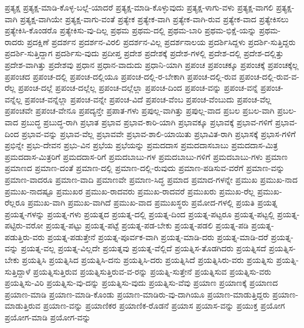 {ಪ್ರತ್ಯಕ್ಷ
ಪ್ರತ್ಯಕ್ಷ-ಮಾಡಿ-ಕೊಳ್ಳ-ಬಲ್ಲೆ-ಯಾದರೆ
ಪ್ರತ್ಯಕ್ಷ-ಮಾಡಿ-ಕೊಳ್ಳುವುದು
ಪ್ರತ್ಯಕ್ಷ-ಳಾಗು-ವಳು
ಪ್ರತ್ಯಕ್ಷ-ವಾಗಲಿ
ಪ್ರತ್ಯಕ್ಷ-ವಾಗಿ
ಪ್ರತ್ಯಕ್ಷ-ವಾಗಿಯೇ
ಪ್ರತ್ಯಕ್ಷ-ವಾಗು-ವಂತೆ
ಪ್ರತ್ಯೇಕ
ಪ್ರತ್ಯೇಕ-ವಾಗಿ
ಪ್ರತ್ಯೇಕ-ವಾಗಿ-ರುವ
ಪ್ರತ್ಯೇಕ-ವಾದ
ಪ್ರತ್ಯೇಕಿಸಲು
ಪ್ರತ್ಯೇಕಿಸಿ-ಕೊಂಡರೊ
ಪ್ರತ್ಯೇಕಿಸು-ವು-ದಿಲ್ಲ
ಪ್ರಥಮ
ಪ್ರಥಮ-ದಲ್ಲಿ
ಪ್ರಥಮ-ಬಾರಿ
ಪ್ರಥಮ-ಭಿಕ್ಷೆ-ಯನ್ನು
ಪ್ರಥಮ-ರಾದರು
ಪ್ರದಕ್ಷಿಣೆ
ಪ್ರದರ್ಶನ
ಪ್ರದರ್ಶನ-ವಿರಲಿ
ಪ್ರದರ್ಶನ-ವಿಲ್ಲ
ಪ್ರದರ್ಶನಾಲಯ
ಪ್ರದರ್ಶಿಸಿದ್ದಳು
ಪ್ರದರ್ಶಿ-ಸುತ್ತಿದ್ದರು
ಪ್ರದರ್ಶಿ-ಸುತ್ತಿದ್ದಾಗ
ಪ್ರದರ್ಶಿಸು-ವುದು
ಪ್ರದೀಪ್ತ
ಪ್ರದೇಶ
ಪ್ರದೇಶಕ್ಕೆ
ಪ್ರದೇಶ-ಗಳಲ್ಲಿ
ಪ್ರದೇಶ-ದಲ್ಲಿ
ಪ್ರದೇಶ-ದಲ್ಲಿತ್ತು
ಪ್ರದೇಶ-ವಾಗಿತ್ತು
ಪ್ರದೇಶವು
ಪ್ರಧಾನ
ಪ್ರಧಾನ-ವಾದುದು
ಪ್ರಧಾನಿ-ಯಾಗಿ
ಪ್ರಪಂಚ
ಪ್ರಪಂಚಕ್ಕೂ
ಪ್ರಪಂಚಕ್ಕೆ
ಪ್ರಪಂಚಕ್ಕೆಲ್ಲ
ಪ್ರಪಂಚದ
ಪ್ರಪಂಚ-ದಲ್ಲಿ
ಪ್ರಪಂಚ-ದಲ್ಲಿಯೂ
ಪ್ರಪಂಚ-ದಲ್ಲಿ-ರ-ಬೇಕಾಗಿ
ಪ್ರಪಂಚ-ದಲ್ಲಿ-ರುವ
ಪ್ರಪಂಚ-ದಲ್ಲಿ-ರುವ-ವ-ರೆಲ್ಲ
ಪ್ರಪಂಚ-ದಲ್ಲೆ
ಪ್ರಪಂಚ-ದಲ್ಲೆಲ್ಲ
ಪ್ರಪಂಚ-ದಲ್ಲೆಲ್ಲಾ
ಪ್ರಪಂಚ-ದಿಂದ
ಪ್ರಪಂಚ-ವನ್ನು
ಪ್ರಪಂಚ-ವನ್ನೆ
ಪ್ರಪಂಚ-ವನ್ನೆಲ್ಲ
ಪ್ರಪಂಚ-ವನ್ನೆಲ್ಲಾ
ಪ್ರಪಂಚ-ವನ್ನೇ
ಪ್ರಪಂಚ-ವಿದೆ
ಪ್ರಪಂಚ-ವೆಂಬ
ಪ್ರಪಂಚ-ವೆಂಬುದು
ಪ್ರಪಂಚ-ವೆಲ್ಲ
ಪ್ರಪಂಚವೇ
ಪ್ರಪಂಚ-ವೇನೂ
ಪ್ರಪದ್ಯನ್ತೇ
ಪ್ರಪಾತ-ಗಳು
ಪ್ರಪುಲ್ಲ-ವಾಗಿತ್ತು
ಪ್ರಪುಲ್ಲ-ವಾದ
ಪ್ರಬಲ
ಪ್ರಬಲ-ವಾಗಿ
ಪ್ರಬಲ-ವಾದ
ಪ್ರಬುದ್ಧ
ಪ್ರಬುದ್ಧ-ರಾಗಿ
ಪ್ರಭಾತ
ಪ್ರಭಾವ
ಪ್ರಭಾವ-ಕಾರಿ-ಯಾಗಿ
ಪ್ರಭಾವಕ್ಕೂ
ಪ್ರಭಾವಕ್ಕೆ
ಪ್ರಭಾವ-ಗಳಿಗೆ
ಪ್ರಭಾವ-ದಿಂದ
ಪ್ರಭಾವ-ವನ್ನು
ಪ್ರಭಾವ-ವೆಲ್ಲ
ಪ್ರಭಾವವೇ
ಪ್ರಭಾವ-ಶಾಲಿ-ಯಾಯಿತು
ಪ್ರಭಾವಿತ-ರಾಗಿ
ಪ್ರಭಾಸಕ್ಕೆ
ಪ್ರಭಾಸ-ಗಳಿಗೆ
ಪ್ರಭಿನ್ನೇ
ಪ್ರಭು-ದೇವನ
ಪ್ರಭು-ವಿನ
ಪ್ರಭೆಯ
ಪ್ರಭೆಯನ್ನು
ಪ್ರಮದದಾಸ
ಪ್ರಮದದಾಸಬಾಬು
ಪ್ರಮದದಾಸ-ಮಿತ್ರ
ಪ್ರಮದದಾಸ-ಮಿತ್ರರಿಗೆ
ಪ್ರಮದದಾಸ-ರಿಗೆ
ಪ್ರಮದಬಾಬು-ಗಳ
ಪ್ರಮದಬಾಬು-ಗಳಿಗೆ
ಪ್ರಮದಬಾಬು-ಗಳು
ಪ್ರಮಾಣ
ಪ್ರಮಾಣದ
ಪ್ರಮಾಣ-ದಂತೆ
ಪ್ರಮಾಣ-ದಲ್ಲಿ
ಪ್ರಮಾಣ-ದಲ್ಲಿ-ರುವುದು
ಪ್ರಮಾಣ-ಪಡಿಸುವ-ವರೆಗೆ
ಪ್ರಮಾಣ-ವನ್ನು
ಪ್ರಮಾಣ-ವಾದರೂ
ಪ್ರಮಾಣ-ವಾದಿ
ಪ್ರಮಾಣವೇ
ಪ್ರಮಾಣ-ಸಿದ್ಧ
ಪ್ರಮಾದ
ಪ್ರಮಾದ-ಗಳನ್ನೇ
ಪ್ರಮುಖ
ಪ್ರಮುಖ-ನಾದ
ಪ್ರಮುಖ-ನಾದಷ್ಟೂ
ಪ್ರಮುಖರ
ಪ್ರಮುಖ-ರಾದವರು
ಪ್ರಮುಖ-ರಾದವರೆ
ಪ್ರಮುಖರು
ಪ್ರಮುಖ-ರೆಲ್ಲ
ಪ್ರಮುಖ-ರೆಲ್ಲರೂ
ಪ್ರಮುಖ-ವಾಗಿ
ಪ್ರಮುಖ-ವಾಗಿದೆ
ಪ್ರಮುಖ-ವಾದ
ಪ್ರಮುಖಸ್ಥರು
ಪ್ರಮೋದ-ಗಳಲ್ಲಿ
ಪ್ರಯತಿ
ಪ್ರಯತ್ನ
ಪ್ರಯತ್ನ-ಗಳನ್ನು
ಪ್ರಯತ್ನ-ಗಳು
ಪ್ರಯತ್ನದ
ಪ್ರಯತ್ನ-ದಲ್ಲಿ
ಪ್ರಯತ್ನ-ದಿಂದ
ಪ್ರಯತ್ನ-ಪಟ್ಟರೂ
ಪ್ರಯತ್ನ-ಪಟ್ಟಲ್ಲಿ
ಪ್ರಯತ್ನ-ಪಟ್ಟಿರು-ವರೋ
ಪ್ರಯತ್ನ-ಪಟ್ಟು
ಪ್ರಯತ್ನ-ಪಟ್ಟೆ
ಪ್ರಯತ್ನ-ಪಡ-ಬೇಕು
ಪ್ರಯತ್ನ-ಪಡಲಿ
ಪ್ರಯತ್ನ-ಪಡಿ
ಪ್ರಯತ್ನ-ಪಡುತ್ತಿರು-ವರು
ಪ್ರಯತ್ನ-ಪಡುತ್ತೇನೆ
ಪ್ರಯತ್ನ-ಪೂರ್ವಕ-ವಾಗಿ
ಪ್ರಯತ್ನ-ಮಾಡಿ-ದರು
ಪ್ರಯತ್ನ-ಮಾಡಿ-ದರೆ
ಪ್ರಯತ್ನ-ವನ್ನು
ಪ್ರಯತ್ನ-ವಲ್ಲ
ಪ್ರಯತ್ನ-ವಿಲ್ಲದೇ
ಪ್ರಯತ್ನವು
ಪ್ರಯತ್ನ-ವೆಲ್ಲಿದೆ
ಪ್ರಯತ್ನಿಸ-ತೊಡಗಿದರು
ಪ್ರಯತ್ನಿಸದೆ
ಪ್ರಯತ್ನಿಸ-ಬೇಕು
ಪ್ರಯತ್ನಿಸಿ
ಪ್ರಯತ್ನಿಸಿದ
ಪ್ರಯತ್ನಿಸಿ-ದನು
ಪ್ರಯತ್ನಿಸಿ-ದರು
ಪ್ರಯತ್ನಿಸಿದೆ
ಪ್ರಯತ್ನಿಸಿರು-ವರು
ಪ್ರಯತ್ನಿಸು
ಪ್ರಯತ್ನಿ-ಸುತ್ತಿದ್ದಾಳೆ
ಪ್ರಯತ್ನಿಸುತ್ತಿರುವ
ಪ್ರಯತ್ನಿಸುತ್ತಿರುವ-ವ-ರನ್ನು
ಪ್ರಯತ್ನಿ-ಸುತ್ತೇನೆ
ಪ್ರಯತ್ನಿಸುವ
ಪ್ರಯತ್ನಿಸು-ವರು
ಪ್ರಯತ್ನಿಸು-ವಿರಿ
ಪ್ರಯತ್ನಿಸು-ವು-ದನ್ನು
ಪ್ರಯತ್ನಿಸು-ವುದು
ಪ್ರಯತ್ನಿಸು-ವೆವು
ಪ್ರಯಾಣ
ಪ್ರಯಾಣಕ್ಕೆ
ಪ್ರಯಾಣದ
ಪ್ರಯಾಣ-ಮಾಡಿ
ಪ್ರಯಾಣ-ಮಾಡಿ-ಕೊಂಡು
ಪ್ರಯಾಣ-ಮಾಡಿರು-ವು-ದಾಗಿಯೂ
ಪ್ರಯಾಣ-ಮಾಡುತ್ತಿದ್ದರು
ಪ್ರಯಾಣ-ಮಾಡುತ್ತಿರುವ
ಪ್ರಯಾಣ-ವನ್ನು
ಪ್ರಯಾಣಿಕರ
ಪ್ರಯಾಣಿಕ-ರೊಡನೆ
ಪ್ರಯಾಸ
ಪ್ರಯಾಸ-ವನ್ನು
ಪ್ರಯುಕ್ತ
ಪ್ರಯೋಗ
ಪ್ರಯೋಗ-ಮಾಡಿ
ಪ್ರಯೋಗ-ವನ್ನು
}
